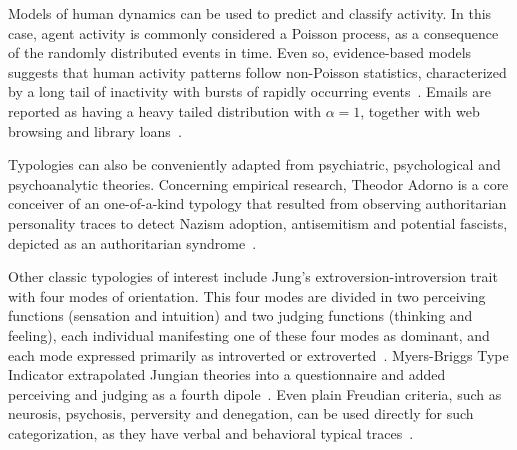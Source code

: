\documentclass[%
 aip,
 jmp,%
 amsmath,amssymb,
 reprint,%
]{revtex4-1}
\begin{document}
Models of human dynamics can be used to predict and classify activity. In this case, agent activity is commonly considered a Poisson process, as a consequence of the randomly distributed events in time. Even so, evidence-based models suggests that human activity patterns follow non-Poisson statistics, characterized by a long tail of inactivity with bursts of rapidly occurring events~\cite{barabasiHumanDyn,barabasiPhone}. Emails are reported as having a heavy tailed distribution with $\alpha=1$, together with web browsing and library loans~\cite{barabasiHumanDyn}.

Typologies can also be conveniently adapted from psychiatric, psychological and psychoanalytic theories.
Concerning empirical research,
Theodor Adorno is a core conceiver of an one-of-a-kind typology that resulted from observing authoritarian
personality traces to detect Nazism adoption, antisemitism and potential fascists, depicted as an authoritarian syndrome~\cite{adorno}.



Other classic typologies of interest include Jung's extroversion-introversion trait with four modes of orientation. This four modes are divided in two perceiving functions (sensation and intuition) and two judging functions (thinking and feeling), each individual manifesting one of these four modes as dominant, and each mode expressed primarily as introverted or extroverted~\cite{jung}. Myers-Briggs Type Indicator extrapolated Jungian theories into a questionnaire and added perceiving and judging as a fourth dipole~\cite{myers}. Even plain Freudian criteria, such as neurosis, psychosis, perversity and denegation, can be used directly for such categorization, as they have verbal and behavioral typical traces~\cite{freud,freud2}.
\end{document}
